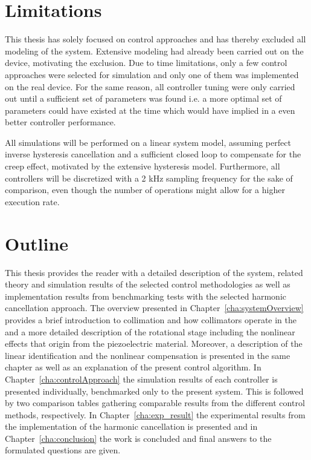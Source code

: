 \section{Limitations}
This thesis has solely focused on control approaches and has thereby excluded all modeling of the system. Extensive modeling had already been carried out on the device, motivating the exclusion. Due to time limitations, only a few control approaches were selected for simulation and only one of them was implemented on the real device. For the same reason, all controller tuning were only carried out until a sufficient set of parameters was found i.e. a more optimal set of parameters could have existed at the time which would have implied in a even better controller performance.

All simulations will be performed on a linear system model, assuming perfect inverse hysteresis cancellation and a sufficient closed loop to compensate for the creep effect, motivated by the extensive hysteresis model. Furthermore, all controllers will be discretized with a 2 kHz sampling frequency for the sake of comparison, even though the number of operations might allow for a higher execution rate.

\section{Outline}
This thesis provides the reader with a detailed description of the system, related theory and simulation results of the selected control methodologies as well as implementation results from benchmarking tests with the selected harmonic cancellation approach. The overview presented in Chapter~\ref{cha:systemOverview} provides a brief introduction to collimation and how collimators operate in the \abbrLHC and a more detailed description of the rotational stage including the nonlinear effects that origin from the piezoelectric material. Moreover, a description of the linear identification and the nonlinear compensation is presented in the same chapter as well as an explanation of the present control algorithm. In Chapter~\ref{cha:controlApproach} the simulation results of each controller is presented individually, benchmarked only to the present system. This is followed by two comparison tables gathering comparable results from the different control methods, respectively. In Chapter~\ref{cha:exp_result} the experimental results from the implementation of the harmonic cancellation is presented and in Chapter~\ref{cha:conclusion} the work is concluded and final answers to the formulated questions are given.
